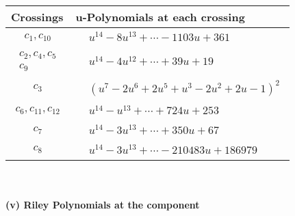 \documentclass[1p]{elsarticle_modified}
\theoremstyle{definition}
\begin{document}
\begin{tabular}{m{50pt}|m{274pt}}
Crossings & \hspace{64pt}u-Polynomials at each crossing \\
\hline $$\begin{aligned}c_{1},c_{10}\end{aligned}$$&$\begin{aligned}
&u^{14}-8 u^{13}+\cdots-1103 u+361
\end{aligned}$\\
\hline $$\begin{aligned}c_{2},c_{4},c_{5}\\c_{9}\end{aligned}$$&$\begin{aligned}
&u^{14}-4 u^{12}+\cdots+39 u+19
\end{aligned}$\\
\hline $$\begin{aligned}c_{3}\end{aligned}$$&$\begin{aligned}
&(u^7-2 u^6+2 u^5+u^3-2 u^2+2 u-1)^2
\end{aligned}$\\
\hline $$\begin{aligned}c_{6},c_{11},c_{12}\end{aligned}$$&$\begin{aligned}
&u^{14}- u^{13}+\cdots+724 u+253
\end{aligned}$\\
\hline $$\begin{aligned}c_{7}\end{aligned}$$&$\begin{aligned}
&u^{14}-3 u^{13}+\cdots+350 u+67
\end{aligned}$\\
\hline $$\begin{aligned}c_{8}\end{aligned}$$&$\begin{aligned}
&u^{14}-3 u^{13}+\cdots-210483 u+186979
\end{aligned}$\\
\hline
\end{tabular}\\~\\
\newpage\renewcommand{\arraystretch}{1}
\flushleft \textbf{(v) Riley Polynomials at the component}\newline \\
\end{document}
